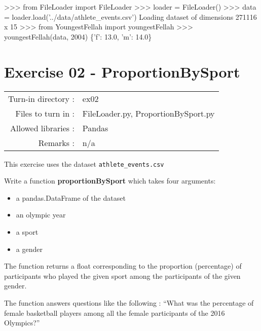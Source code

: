 \documentclass[]{article}
\newenvironment{Shaded}{\begin{snugshade}}{\end{snugshade}}
\newcommand{\DecValTok}[1]{\textcolor[rgb]{0.96,0.45,0.00}{#1}}
\newcommand{\FloatTok}[1]{\textcolor[rgb]{0.96,0.45,0.00}{#1}}
\newcommand{\ImportTok}[1]{\textcolor[rgb]{0.15,0.68,0.38}{#1}}
\newcommand{\NormalTok}[1]{\textcolor[rgb]{0.81,0.81,0.76}{#1}}
\newcommand{\OperatorTok}[1]{\textcolor[rgb]{0.81,0.81,0.76}{#1}}
\newcommand{\StringTok}[1]{\textcolor[rgb]{0.96,0.31,0.31}{#1}}
\begin{document}
\begin{Shaded}
\begin{Highlighting}[]
\OperatorTok{>>>} \ImportTok{from}\NormalTok{ FileLoader }\ImportTok{import}\NormalTok{ FileLoader}
\OperatorTok{>>>}\NormalTok{ loader }\OperatorTok{=}\NormalTok{ FileLoader()}
\OperatorTok{>>>}\NormalTok{ data }\OperatorTok{=}\NormalTok{ loader.load(}\StringTok{'../data/athlete_events.csv'}\NormalTok{)}
\NormalTok{Loading dataset of dimensions }\DecValTok{271116}\NormalTok{ x }\DecValTok{15}
\OperatorTok{>>>} \ImportTok{from}\NormalTok{ YoungestFellah }\ImportTok{import}\NormalTok{ youngestFellah}
\OperatorTok{>>>}\NormalTok{ youngestFellah(data, }\DecValTok{2004}\NormalTok{)}
\NormalTok{\{}\StringTok{'f'}\NormalTok{: }\FloatTok{13.0}\NormalTok{, }\StringTok{'m'}\NormalTok{: }\FloatTok{14.0}\NormalTok{\}}
\end{Highlighting}
\end{Shaded}

\clearpage

\hypertarget{exercise-02---proportionbysport-1}{%
\section{Exercise 02 -
ProportionBySport}\label{exercise-02---proportionbysport-1}}

\begin{longtable}[]{@{}rl@{}}
\toprule
\endhead
Turn-in directory : & ex02\tabularnewline
Files to turn in : & FileLoader.py, ProportionBySport.py\tabularnewline
Allowed libraries : & Pandas\tabularnewline
Remarks : & n/a\tabularnewline
\bottomrule
\end{longtable}

This exercise uses the dataset \texttt{athlete\_events.csv}

Write a function \textbf{proportionBySport} which takes four arguments:

\begin{itemize}
\item
  a pandas.DataFrame of the dataset
\item
  an olympic year
\item
  a sport
\item
  a gender
\end{itemize}

The function returns a float corresponding to the proportion
(percentage) of participants who played the given sport among the
participants of the given gender.

The function answers questions like the following : ``What was the
percentage of female basketball players among all the female
participants of the 2016 Olympics?''
\end{document}
